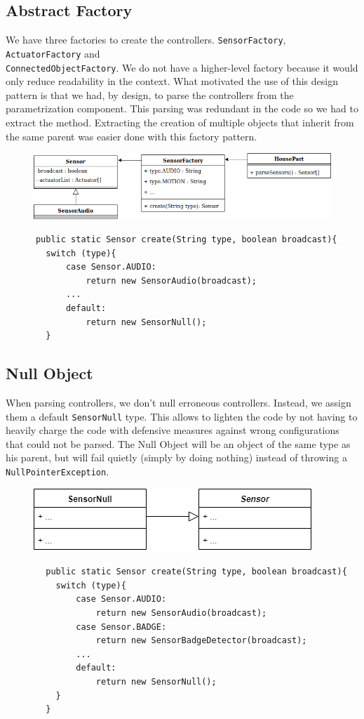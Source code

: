     \subsection{Abstract Factory}
      We have three factories to create the controllers. \texttt{SensorFactory}, \texttt{ActuatorFactory} and \\ \texttt{ConnectedObjectFactory}. We do not have a higher-level factory because it would only reduce readability in the context. What motivated the use of this design pattern is that we had, by design, to parse the controllers from the parametrization component. This parsing was redundant in the code so we had to extract the method. Extracting the creation of multiple objects that inherit from the same parent was easier done with this factory pattern.
      \begin{figure}[!h]
        \includegraphics[width=\textwidth]{sensorfactory.png}
      \end{figure}
      \begin{verbatim}
      public static Sensor create(String type, boolean broadcast){
        switch (type){
            case Sensor.AUDIO:
                return new SensorAudio(broadcast);
            ...
            default:
                return new SensorNull();
        }
      \end{verbatim}

      \subsection{Null Object}
        When parsing controllers, we don't null erroneous controllers. Instead, we assign them a default \texttt{SensorNull} type. This allows to lighten the code by not having to heavily charge the code with defensive measures against wrong configurations that could not be parsed. The Null Object will be an object of the same type as his parent, but will fail quietly (simply by doing nothing) instead of throwing a \texttt{NullPointerException}.
        \begin{figure}[!h]
          \includegraphics[scale=0.75]{nullsensor.png}
        \end{figure}
        \begin{verbatim}
        public static Sensor create(String type, boolean broadcast){
          switch (type){
              case Sensor.AUDIO:
                  return new SensorAudio(broadcast);
              case Sensor.BADGE:
                  return new SensorBadgeDetector(broadcast);
              ...
              default:
                  return new SensorNull();
          }
        }
        \end{verbatim}
